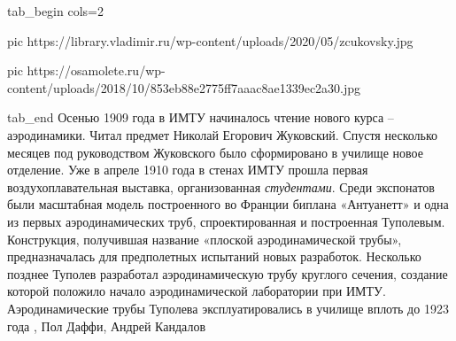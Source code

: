 \ifcmt
  tab_begin cols=2

     pic https://library.vladimir.ru/wp-content/uploads/2020/05/zcukovsky.jpg

		 pic https://osamolete.ru/wp-content/uploads/2018/10/853eb88e2775ff7aaac8ae1339ec2a30.jpg

  tab_end
\fi
Осенью 1909 года в ИМТУ начиналось чтение нового курса – аэродинамики. Читал
предмет Николай Егорович Жуковский. Спустя несколько месяцев под руководством
Жуковского было сформировано в училище новое отделение. Уже в апреле 1910 года
в стенах ИМТУ прошла первая воздухоплавательная выставка, организованная
\emph{студентами}. Среди экспонатов были масштабная модель построенного во
Франции биплана «Антуанетт» и одна из первых аэродинамических труб,
спроектированная и построенная Туполевым. Конструкция, получившая название
«плоской аэродинамической трубы», предназначалась для предполетных испытаний
новых разработок. Несколько позднее Туполев разработал аэродинамическую трубу
круглого сечения, создание которой положило начало аэродинамической лаборатории
при ИМТУ. Аэродинамические трубы Туполева эксплуатировались в училище вплоть до
1923 года
, Пол Даффи, Андрей Кандалов
